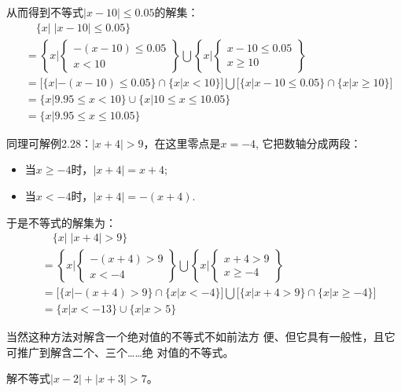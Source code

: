 从而得到不等式$|x-10|\le 0.05$的解集：
\[\begin{split}
  &\quad   \{x|\; |x-10|\le 0.05\}\\
  &=\left\{x\Big| \begin{cases}
    -(x-10)\le 0.05\\x<10
\end{cases}\right\}\bigcup \left\{x\Big| \begin{cases}
    x-10\le 0.05\\x\ge 10
\end{cases}\right\}\\
&=\Big[\{x|-(x-10)\le 0.05\}\cap\{x|x<10\}\Big]\bigcup\Big[\{x|x-10\le 0.05\}\cap\{x|x\ge 10\}\Big]\\
&=\{x|9.95\le x<10\}\cup\{x|10\le x\le 10.05\}\\
&=\{x|9.95\le x\le 10.05\}
\end{split}
    \]

    同理可解例2.28：$|x+4|>9$，在这里零点是$x=-4$, 它把数轴分成两段：
    \begin{itemize}
        \item  当$x\ge -4$时，$|x+4|=x+4$;
        \item  当$x<-4$时，$|x+4|=-(x+4)$.
    \end{itemize}
    于是不等式的解集为：
\[\begin{split}
    &\quad \{x|\; |x+4|>9\} \\
&= \left\{x\Big|\begin{cases}
    -(x+4)>9\\x<-4
\end{cases}\right\}\bigcup \left\{x\Big|\begin{cases}
    x+4>9\\x\ge -4
\end{cases}\right\}\\
    &=\Big[\{x|-(x+4)>9\}\cap\{x|x<-4\}\Big]\bigcup\Big[\{x|x+4>9\}\cap\{x|x\ge -4\}\Big]\\
    &=\{x|x<-13\}\cup\{x|x>5\}
\end{split}\]

当然这种方法对解含一个绝对值的不等式不如前法方
便、但它具有一般性，且它可推广到解含二个、三个……绝
对值的不等式。

\begin{example}
    解不等式$|x-2|+|x+3|>7$。
\end{example}

